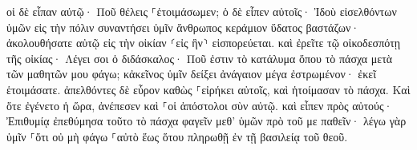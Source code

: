 \documentclass{openreader}
\begin{document}
οἱ δὲ εἶπαν αὐτῷ· Ποῦ θέλεις ⸀ἑτοιμάσωμεν; 
ὁ δὲ εἶπεν αὐτοῖς· Ἰδοὺ εἰσελθόντων ὑμῶν εἰς τὴν πόλιν συναντήσει ὑμῖν ἄνθρωπος κεράμιον ὕδατος βαστάζων· ἀκολουθήσατε αὐτῷ εἰς τὴν οἰκίαν ⸂εἰς ἣν⸃ εἰσπορεύεται. 
καὶ ἐρεῖτε τῷ οἰκοδεσπότῃ τῆς οἰκίας· Λέγει σοι ὁ διδάσκαλος· Ποῦ ἐστιν τὸ κατάλυμα ὅπου τὸ πάσχα μετὰ τῶν μαθητῶν μου φάγω; 
κἀκεῖνος ὑμῖν δείξει ἀνάγαιον μέγα ἐστρωμένον· ἐκεῖ ἑτοιμάσατε. 
ἀπελθόντες δὲ εὗρον καθὼς ⸀εἰρήκει αὐτοῖς, καὶ ἡτοίμασαν τὸ πάσχα. 
Καὶ ὅτε ἐγένετο ἡ ὥρα, ἀνέπεσεν καὶ ⸀οἱ ἀπόστολοι σὺν αὐτῷ. 
καὶ εἶπεν πρὸς αὐτούς· Ἐπιθυμίᾳ ἐπεθύμησα τοῦτο τὸ πάσχα φαγεῖν μεθ’ ὑμῶν πρὸ τοῦ με παθεῖν· 
λέγω γὰρ ὑμῖν ⸀ὅτι οὐ μὴ φάγω ⸀αὐτὸ ἕως ὅτου πληρωθῇ ἐν τῇ βασιλείᾳ τοῦ θεοῦ. 
\end{document}
